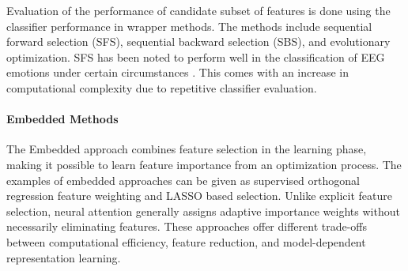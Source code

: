 \documentclass[ASNA,twocolumn]{USG}
\begin{document}
Evaluation of the performance of candidate subset of features is done using the classifier performance in wrapper methods. The methods include sequential forward selection (SFS), sequential backward selection (SBS), and evolutionary optimization. SFS has been noted to perform well in the classification of EEG emotions under certain circumstances \cite{hatamikia2014emotion}. This comes with an increase in computational complexity due to repetitive classifier evaluation.

\paragraph{Embedded Methods}

The Embedded approach combines feature selection in the learning phase, making it possible to learn feature importance from an optimization process. The examples of embedded approaches can be given as supervised orthogonal regression feature weighting and LASSO based selection. Unlike explicit feature selection, neural attention generally assigns adaptive importance weights without necessarily eliminating features. These approaches offer different trade-offs between computational efficiency, feature reduction, and model-dependent representation learning.
\end{document}
